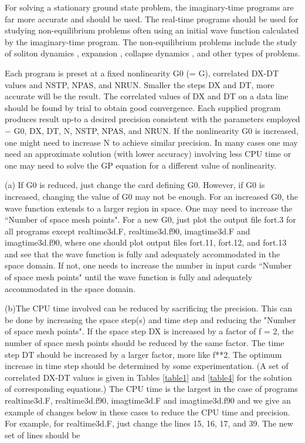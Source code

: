\documentclass[onecolumn]{elsart3p}
\begin{document}
For solving a stationary ground state problem, the imaginary-time 
programs  are far more
accurate and should be used. The real-time programs should be used for studying
non-equilibrium problems often using  an initial wave function calculated by the
imaginary-time program. The non-equilibrium problems include the study of
soliton dynamics \cite{ska3}, expansion \cite{ska4}, collapse dynamics
\cite{ska5}, and other types of problems.

Each program is preset at a fixed nonlinearity G0 (= G), correlated DX-DT values
and NSTP, NPAS, and NRUN.  Smaller the steps DX and DT, more accurate will be
the result.  The correlated values of DX and DT on a data line should be found
by trial to obtain good convergence. 
Each supplied program produces result up-to a desired precision consistent
with the parameters employed $-$ G0, DX, DT, N, NSTP, NPAS, and NRUN. If the
nonlinearity G0 is increased, one might need to increase N to achieve similar
precision.
In many cases one may need an approximate solution (with lower
accuracy) involving less CPU time or one may need to solve the GP
equation for a different value of nonlinearity. 

(a) If G0 is reduced, just
change the card defining G0. However, if G0 is increased, changing the
value of G0 may not be enough.  For an increased G0, the wave function
extends to a larger region in space. One may need to increase the
``Number of space mesh points". For a new G0, just plot the output file
fort.3 for all programs except realtime3d.F, realtime3d.f90,
imagtime3d.F and imagtime3d.f90, where one should plot output files
fort.11, fort.12, and fort.13 and see that the wave function is fully
and adequately accommodated in the space domain. If not, one needs to
increase the number in input cards ``Number of space mesh points" until
the wave function is fully and adequately accommodated in the space
domain. 

(b)The CPU time involved can be reduced by sacrificing the precision.
This can be done by increasing the space step(s) and time step and
reducing the "Number of space mesh points". If the space step DX is
increased by a factor of f = 2, the number of space mesh points should
be reduced by the same factor. The time step DT should be increased by a
larger factor, more like f**2. The optimum increase in time step should
be determined by some experimentation. (A set of
correlated DX-DT
values is given in Tables \ref{table1} and \ref{table4} for the 
solution of corresponding equations.)
The CPU time is the largest in
the case of programs realtime3d.F, realtime3d.f90, imagtime3d.F and
imagtime3d.f90 and we give an example of changes below in these cases
to reduce the CPU time and precision. For example, for realtime3d.F, 
just change the 
lines  15, 16, 17, and 39.  The new
set of lines should be
\end{document}
